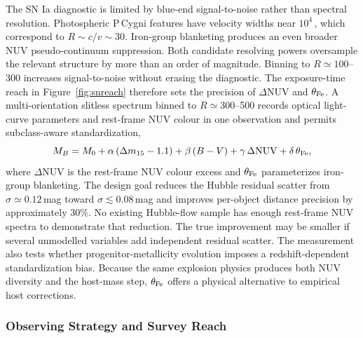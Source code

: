 The SN Ia diagnostic is limited by blue-end signal-to-noise rather than spectral resolution. Photospheric P\,Cygni features have velocity widths near $10^4$\,\kms, which correspond to $R\sim c/v\sim30$. Iron-group blanketing produces an even broader NUV pseudo-continuum suppression. Both candidate resolving powers oversample the relevant structure by more than an order of magnitude. Binning to $R\simeq100$--300 increases signal-to-noise without erasing the diagnostic. The exposure-time reach in Figure~\ref{fig:snreach} therefore sets the precision of $\Delta\mathrm{NUV}$ and $\theta_{\rm Fe}$. A multi-orientation slitless spectrum binned to $R\simeq300$--500 records optical light-curve parameters and rest-frame NUV colour in one observation and permits subclass-aware standardization,
\begin{equation}
M_B = M_0 + \alpha\,(\Delta m_{15}-1.1) + \beta\,(B-V) + \gamma\,\Delta\mathrm{NUV} + \delta\,\theta_{\rm Fe},
\label{eq:nuvstd}
\end{equation}
where $\Delta\mathrm{NUV}$ is the rest-frame NUV colour excess and $\theta_{\rm Fe}$ parameterizes iron-group blanketing. The design goal reduces the Hubble residual scatter from $\sigma\simeq0.12$\,mag toward $\sigma\lesssim0.08$\,mag and improves per-object distance precision by approximately $30\%$. No existing Hubble-flow sample has enough rest-frame NUV spectra to demonstrate that reduction. The true improvement may be smaller if several unmodelled variables add independent residual scatter. The measurement also tests whether progenitor-metallicity evolution imposes a redshift-dependent standardization bias. Because the same explosion physics produces both NUV diversity and the host-mass step, $\theta_{\rm Fe}$ offers a physical alternative to empirical host corrections.

\subsubsection{Observing Strategy and Survey Reach}

